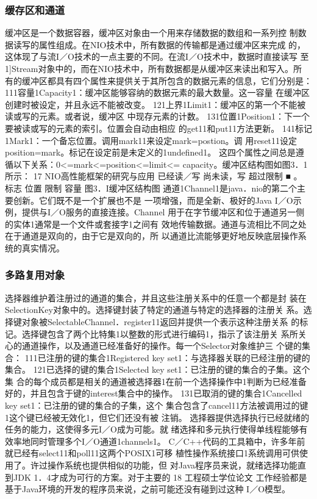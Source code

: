 \subsubsection*{缓存区和通道}
缓冲区是一个数据容器，缓冲区对象由一个用来存储数据的数组和一系列控
制数据读写的属性组成。在NIO技术中，所有数据的传输都是通过缓冲区来完成
的，这体现了与流I／O技术的一点主要的不同。在流I／O技术中，数据时直接读写
至1]Stream对象中的，而在NIO技术中，所有数据都是从缓冲区来读出和写入。所
有的缓冲区都具有四个属性来提供关于其所包含的数据元素的信息，它们分别是：
111容量1Capacity1：缓冲区能够容纳的数据元素的最大数量。这一容量
在缓冲区创建时被设定，并且永远不能被改变。
121上界1Limit1：缓冲区的第一个不能被读或写的元素。或者说，缓冲区
中现存元素的计数。
131位置1Position1：下一个要被读或写的元素的索引。位置会自动由相应
的get11和put11方法更新。
141标记1Mark1：一个备忘位置。调用mark11来设定mark=postion。调
用reset11设定position=mark。标记在设定前是未定义的1undefined1。
这四个属性之间总是遵循以下关系：0<=mark<=position<=limit<=
capacity。缓冲区结构图如图3．1所示：
17
NIO高性能框架的研究与应用
已经读／写
尚未读，写 超过限制
■
。
标志 位置 限制 容量
图3．I缓冲区结构图
通道1Channel1是java．nio的第二个主要创新。它们既不是一个扩展也不是
一项增强，而是全新、极好的Java I／O示例，提供与I／O服务的直接连接。Channel
用于在字节缓冲区和位于通道另一侧的实体1通常是一个文件或套接字1之间有
效地传输数据。通道与流相比不同之处在于通道是双向的，由于它是双向的，所
以通道比流能够更好地反映底层操作系统的真实情况。
\subsubsection*{多路复用对象}
选择器维护着注册过的通道的集合，并且这些注册关系中的任意一个都是封
装在SelectionKey对象中的。选择键封装了特定的通道与特定的选择器的注册关
系。选择键对象被SelectableChannel．register11返回并提供一个表示这种注册关系
的标记。选择键包含了两个比特集1以整数的形式进行编码1，指示了该注册关
系所关心的通道操作，以及通道已经准备好的操作。每一个Selector对象维护三
个键的集合：
111已注册的键的集合1Registered key set1：与选择器关联的已经注册的键的
集合。
121已选择的键的集合1Selected key set1：已注册的键的集合的子集。这个集
合的每个成员都是相关的通道被选择器1在前一个选择操作中1判断为已经准备
好的，并且包含于键的interest集合中的操作。
131已取消的键的集合1Cancelled key set1：已注册的键的集合的子集，这个
集合包含了cancel11方法被调用过的键1这个键已经被无效化1，但它们还没有被
注销。
选择器提供选择执行已经就绪的任务的能力，这使得多元I／O成为可能。就
绪选择和多元执行使得单线程能够有效率地同时管理多个I／O通道1channels1。
C／C++代码的工具箱中，许多年前就已经有select11和poll11这两个POSIX1可移
植性操作系统接口1系统调用可供使用了。许过操作系统也提供相似的功能，但
对Java程序员来说，就绪选择功能直到JDK 1．4才成为可行的方案。对于主要的
18
工程硕士学位论文
工作经验都是基于Java环境的开发的程序员来说，之前可能还没有碰到过这种
I／O模型。

